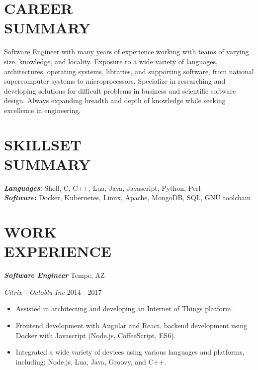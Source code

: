\documentclass[line,margin]{res}
\renewcommand{\headrulewidth}{0pt} %
\begin{document}
\thispagestyle{empty}


\renewcommand{\headrulewidth}{0pt}

\begin{resume}

  \section{CAREER\\SUMMARY}
  Software Engineer with many years of experience working with teams of varying size, knowledge, and locality.
  Exposure to a wide variety of languages, architectures, operating systems, libraries, and supporting
  software, from national supercomputer systems to microprocessors. Specialize in researching and developing
  solutions for difficult problems in business and scientific software design. Always expanding breadth and
  depth of knowledge while seeking excellence in engineering.

  \section{SKILLSET\\SUMMARY}
          {\bf \emph{Languages}:} Shell, C, C++, Lua, Java, Javascript, Python, Perl\\ %
          {\bf \emph{Software}:} Docker, Kubernetes, Linux, Apache, MongoDB, SQL, GNU toolchain \\ %

  \section{WORK\\EXPERIENCE}
          {\bf \emph{Software Engineer}} \hfill Tempe, AZ

          {\sl Citrix - Octoblu Inc} \hfill 2014 - 2017
          \begin{itemize} \itemsep -2pt
          \item
            Assisted in architecting and developing an Internet of Things platform.
          \item
            Frontend development with Angular and React, backend development using Docker with Javascript (Node.js, CoffeeScript, ES6).
          \item
            Integrated a wide variety of devices using various languages and platforms, including: Node.js, Lua, Java, Groovy, and C++.
          \end{itemize}


\end{resume}
\end{document}
